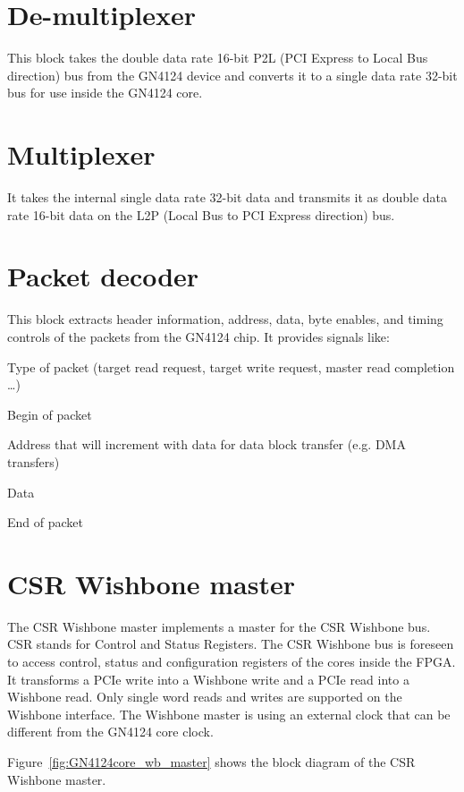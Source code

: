 \documentclass[10pt,a4paper]{cerndoc}
\begin{document}
 \section{De-multiplexer}
 This block takes the double data rate 16-bit P2L (PCI Express to Local
 Bus direction) bus from the GN4124 device and converts it to a single
 data rate 32-bit bus for use inside the GN4124 core.


 \section{Multiplexer}
 It takes the internal single data rate 32-bit data and transmits it as
 double data rate 16-bit data on the L2P (Local Bus to PCI Express
 direction) bus.


 \section{Packet decoder}
 This block extracts header information, address, data, byte enables,
 and timing controls of the packets from the GN4124 chip. It provides
 signals like:

 \begin{packed_item}
  \item Type of packet (target read request, target write request, master read completion \dots)
  \item Begin of packet
  \item Address that will increment with data for data block transfer (e.g. DMA transfers)
  \item Data
  \item End of packet
 \end{packed_item}


 \section{CSR Wishbone master}
 The CSR Wishbone master implements a master for the CSR Wishbone
 bus. CSR stands for Control and Status Registers. The CSR Wishbone bus
 is foreseen to access control, status and configuration registers of
 the cores inside the FPGA.
 It transforms a PCIe write into a Wishbone write and a PCIe read into a
 Wishbone read. Only single word reads and writes are supported on the
 Wishbone interface.
 The Wishbone master is using an external clock that can be different
 from the GN4124 core clock.

 Figure~\ref{fig:GN4124core_wb_master} shows the block diagram of the
 CSR Wishbone master.
\end{document}
